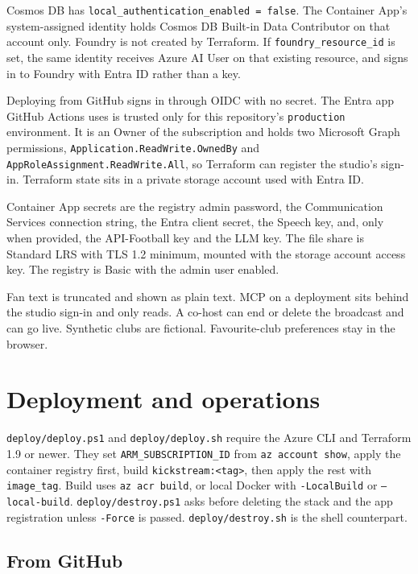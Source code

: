 \documentclass[11pt]{article}
\begin{document}
Cosmos DB has \texttt{local\_authentication\_enabled = false}.
The Container App's system-assigned identity holds Cosmos DB Built-in Data Contributor
on that account only.
Foundry is not created by Terraform.
If \texttt{foundry\_resource\_id} is set, the same identity receives Azure AI User
on that existing resource, and signs in to Foundry with Entra ID rather than a key.

Deploying from GitHub signs in through OIDC with no secret. The Entra app GitHub
Actions uses is trusted only for this repository's \texttt{production} environment.
It is an Owner of the subscription and holds two Microsoft Graph permissions,
\texttt{Application.ReadWrite.OwnedBy} and \texttt{AppRoleAssignment.ReadWrite.All},
so Terraform can register the studio's sign-in.
Terraform state sits in a private storage account used with Entra ID.

Container App secrets are the registry admin password, the Communication Services
connection string, the Entra client secret, the Speech key, and, only when
provided, the API-Football key and the LLM key.
The file share is Standard LRS with TLS 1.2 minimum, mounted with the storage
account access key.
The registry is Basic with the admin user enabled.

Fan text is truncated and shown as plain text.
MCP on a deployment sits behind the studio sign-in and only reads.
A co-host can end or delete the broadcast and can go live.
Synthetic clubs are fictional.
Favourite-club preferences stay in the browser.

\section{Deployment and operations}

\texttt{deploy/deploy.ps1} and \texttt{deploy/deploy.sh} require the Azure CLI
and Terraform 1.9 or newer.
They set \texttt{ARM\_SUBSCRIPTION\_ID} from \texttt{az account show}, apply the
container registry first, build \texttt{kickstream:<tag>}, then apply the rest
with \texttt{image\_tag}.
Build uses \texttt{az acr build}, or local Docker with \texttt{-LocalBuild} or
\texttt{--local-build}.
\texttt{deploy/destroy.ps1} asks before deleting the stack and the app registration
unless \texttt{-Force} is passed.
\texttt{deploy/destroy.sh} is the shell counterpart.

\subsection{From GitHub}
\end{document}
